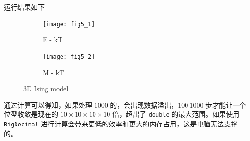\documentclass[UTF8]{ctexart}
\begin{document}
    运行结果如下
    \begin{figure}[htbp]
        \centering
        \begin{subfigure}[b]{0.42\textwidth}
            \texttt{[image: fig5\_1]}
            \caption{E - kT}\label{fig:5.1}
        \end{subfigure}
        \hfill
        \begin{subfigure}[b]{0.42\textwidth}
            \texttt{[image: fig5\_2]}
            \caption{M - kT}\label{fig:5.2}
        \end{subfigure}
        \caption{3D Ising model}\label{fig:5}
    \end{figure}

    通过计算可以得知，如果处理 \(1000\) 的，会出现数据溢出，\(100~1000\) 步才能让一个位型收敛是现在的 \(10 \times 10 \times 10 \times 10\) 倍，超出了 \texttt{double} 的最大范围。如果使用 \texttt{BigDecimal} 进行计算会带来更低的效率和更大的内存占用，这是电脑无法支撑的。
\end{document}

